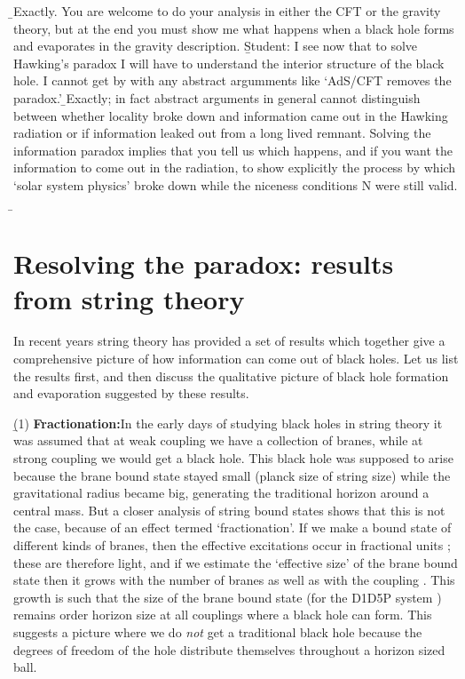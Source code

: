 \documentclass[12pt]{article}
\begin{document}
\b
\hb Exactly. You are welcome to do your analysis in either the CFT or the gravity theory, but at the end you must show me what happens when a black hole forms and evaporates in the gravity description. 
\b
Student: I see now that to solve Hawking's paradox I will have to understand the interior structure of the black hole. I cannot get by with any abstract argumments like `AdS/CFT removes the paradox.'
\b
\hb Exactly; in fact  abstract arguments in general cannot distinguish between whether locality broke down and information came out in the Hawking radiation or if information leaked out from a long lived remnant. Solving the information paradox implies that you tell us which happens, and if you want the information to come out in the radiation, to show explicitly the process by which `solar system physics' broke down while the niceness conditions N were still valid.
\b
\section{Resolving the paradox: results from string theory}

In recent years string theory has provided a set of results which together give a comprehensive picture of how information can come out of black holes. Let us list the results first, and then discuss  the qualitative picture of black hole formation and evaporation suggested by these results. 

\b

(1) {\bf Fractionation:}\quad In the early days of studying black holes in string theory it was assumed that at weak coupling we have a collection of branes, while at strong coupling we would get a black hole. This black hole was supposed to arise because the brane bound state stayed small (planck size of string size) while the gravitational radius became big, generating the traditional horizon around a central mass. But a closer analysis of string bound states shows that this is not the case, because of an effect termed `fractionation'. If we make a bound state of different kinds of branes, then the effective excitations occur in fractional units \cite{dasmathurpre}; these are therefore light, and if we estimate the `effective size' of the brane bound state then it grows with the number of branes as well as with the coupling \cite{emission}. This growth is such that the size of the brane bound state (for the D1D5P system \cite{sv}) remains order horizon size at all couplings where a black hole can form. This suggests a picture where we do {\it not} get a traditional black hole because the degrees of freedom of the hole distribute themselves throughout a horizon sized ball.
\end{document}
